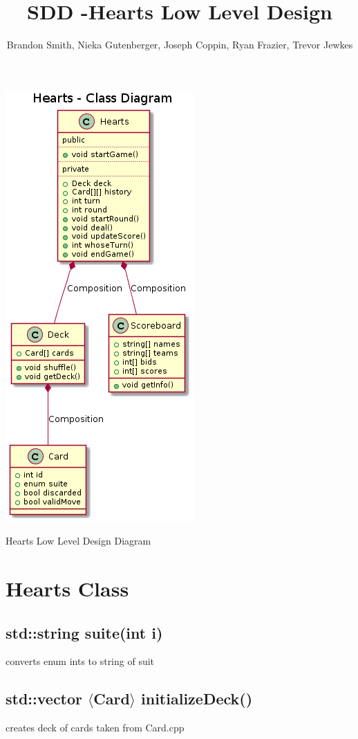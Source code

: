 \documentclass[]{scrartcl}
\title{SDD -Hearts Low Level Design}
\author{Brandon Smith, Nieka Gutenberger, Joseph Coppin, Ryan Frazier, Trevor Jewkes}
\begin{document}
\maketitle

\centerline{\includegraphics{Hearts_Class_diagram.png}}
\centerline{Hearts Low Level Design Diagram}

\section{Hearts Class}



\subsection{std::string suite(int i)}  
	converts enum ints to string of suit
\subsection{std::vector $\langle$Card$\rangle$ initializeDeck()} 
	creates deck of cards taken from Card.cpp
\end{document}
